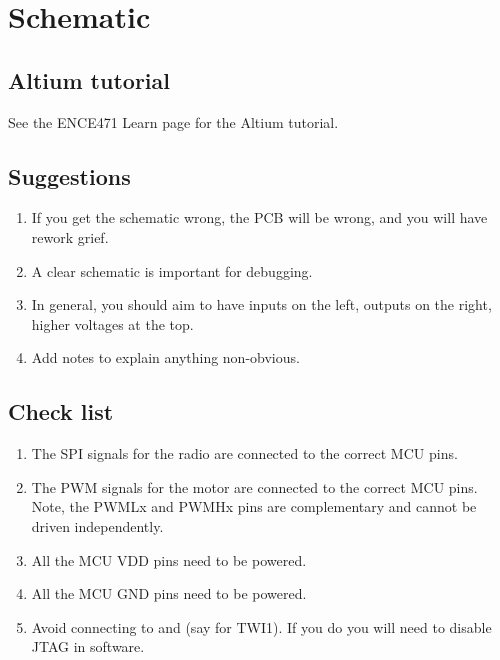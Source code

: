 \chapter{Schematic}


\section{Altium tutorial}


See the ENCE471 Learn page for the Altium tutorial.


\section{Suggestions}

\begin{enumerate}
\item If you get the schematic wrong, the PCB will be wrong, and you
  will have rework grief.
  
\item A clear schematic is important for debugging.

\item In general, you should aim to have inputs on the left, outputs
  on the right, higher voltages at the top.

\item Add notes to explain anything non-obvious.
\end{enumerate}



\section{Check list}
\label{PCB-check-list}

\begin{enumerate}
\item
  The SPI signals for the radio are connected to the correct MCU pins.
\item
  The PWM signals for the motor are connected to the correct MCU pins.
  Note, the PWMLx and PWMHx pins are complementary and cannot be driven
  independently.
\item
  All the MCU VDD pins need to be powered.
\item
  All the MCU GND pins need to be powered.
\item
  Avoid connecting to  and  (say for TWI1).  If you
  do you will need to disable JTAG in software.
\end{enumerate}




